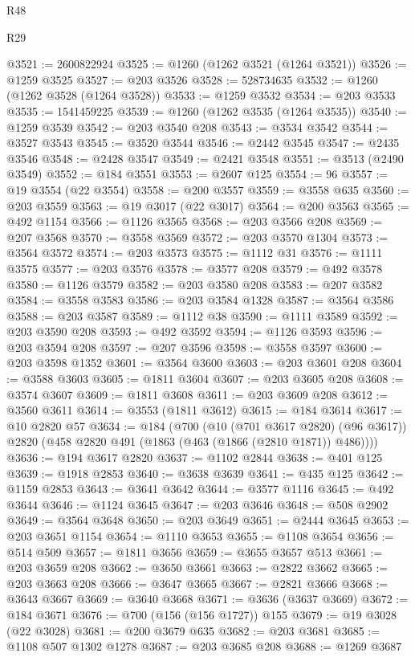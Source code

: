 \begin{lexlean}{R48}
\begin{lexlean}{R29}
\begin{coremodule}
{{{{{{{{{{{{{{{{{{{{{{{{{{{{{{{{{{{{{{{{{{{{{{{{{{{{{{{{{{{{{{{{{{{{{{{{{{{{{{{{{{{{{{{{{{{{{{{{{{{{{{{{{{{{{{{{{{{{{{{{{{{{{{{{{{{{{{{{{{{{{{{{{{{{{{{{{{{{{{{{{{{{{{{{{{{{{{{{{{{{{{{{{{{{{{{{{{{{{{{{{{{{{{{{{{{{{{{{{{@3521 := 2600822924
@3525 := @1260 (@1262 @3521 (@1264 @3521))
@3526 := @1259 @3525
@3527 := @203 @3526
@3528 := 528734635
@3532 := @1260 (@1262 @3528 (@1264 @3528))
@3533 := @1259 @3532
@3534 := @203 @3533
@3535 := 1541459225
@3539 := @1260 (@1262 @3535 (@1264 @3535))
@3540 := @1259 @3539
@3542 := @203 @3540 @208
@3543 := @3534 @3542
@3544 := @3527 @3543
@3545 := @3520 @3544
@3546 := @2442 @3545
@3547 := @2435 @3546
@3548 := @2428 @3547
@3549 := @2421 @3548
@3551 := @3513 (@2490 @3549)
@3552 := @184 @3551
@3553 := @2607 @125
@3554 := 96
@3557 := @19 @3554 (@22 @3554)
@3558 := @200 @3557
@3559 := @3558 @635
@3560 := @203 @3559
@3563 := @19 @3017 (@22 @3017)
@3564 := @200 @3563
@3565 := @492 @1154
@3566 := @1126 @3565
@3568 := @203 @3566 @208
@3569 := @207 @3568
@3570 := @3558 @3569
@3572 := @203 @3570 @1304
@3573 := @3564 @3572
@3574 := @203 @3573
@3575 := @1112 @31
@3576 := @1111 @3575
@3577 := @203 @3576
@3578 := @3577 @208
@3579 := @492 @3578
@3580 := @1126 @3579
@3582 := @203 @3580 @208
@3583 := @207 @3582
@3584 := @3558 @3583
@3586 := @203 @3584 @1328
@3587 := @3564 @3586
@3588 := @203 @3587
@3589 := @1112 @38
@3590 := @1111 @3589
@3592 := @203 @3590 @208
@3593 := @492 @3592
@3594 := @1126 @3593
@3596 := @203 @3594 @208
@3597 := @207 @3596
@3598 := @3558 @3597
@3600 := @203 @3598 @1352
@3601 := @3564 @3600
@3603 := @203 @3601 @208
@3604 := @3588 @3603
@3605 := @1811 @3604
@3607 := @203 @3605 @208
@3608 := @3574 @3607
@3609 := @1811 @3608
@3611 := @203 @3609 @208
@3612 := @3560 @3611
@3614 := @3553 (@1811 @3612)
@3615 := @184 @3614
@3617 := @10 @2820 @57
@3634 := @184
    (@700
      (@10 (@701 @3617 @2820) (@96 @3617))
      @2820
      (@458 @2820 @491 (@1863 (@463 (@1866 (@2810 @1871)) @486))))
@3636 := @194 @3617 @2820
@3637 := @1102 @2844
@3638 := @401 @125
@3639 := @1918 @2853
@3640 := @3638 @3639
@3641 := @435 @125
@3642 := @1159 @2853
@3643 := @3641 @3642
@3644 := @3577 @1116
@3645 := @492 @3644
@3646 := @1124 @3645
@3647 := @203 @3646
@3648 := @508 @2902
@3649 := @3564 @3648
@3650 := @203 @3649
@3651 := @2444 @3645
@3653 := @203 @3651 @1154
@3654 := @1110 @3653
@3655 := @1108 @3654
@3656 := @514 @509
@3657 := @1811 @3656
@3659 := @3655 @3657 @513
@3661 := @203 @3659 @208
@3662 := @3650 @3661
@3663 := @2822 @3662
@3665 := @203 @3663 @208
@3666 := @3647 @3665
@3667 := @2821 @3666
@3668 := @3643 @3667
@3669 := @3640 @3668
@3671 := @3636 (@3637 @3669)
@3672 := @184 @3671
@3676 := @700 (@156 (@156 @1727)) @155
@3679 := @19 @3028 (@22 @3028)
@3681 := @200 @3679 @635
@3682 := @203 @3681
@3685 := @1108 @507 @1302 @1278
@3687 := @203 @3685 @208
@3688 := @1269 @3687
}}}}}}}}}}}}}}}}}}}}}}}}}}}}}}}}}}}}}}}}}}}}}}}}}}}}}}}}}}}}}}}}}}}}}}}}}}}}}}}}}}}}}}}}}}}}}}}}}}}}}}}}}}}}}}}}}}}}}}}}}}}}}}}}}}}}}}}}}}}}}}}}}}}}}}}}}}}}}}}}}}}}}}}}}}}}}}}}}}}}}}}}}}}}}}}}}}}}}}}}}}}}}}}}}}}}}}}}}}
\end{coremodule}
\end{lexlean}
\end{lexlean}
